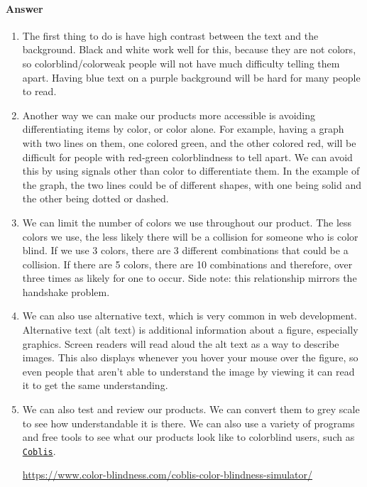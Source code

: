 \documentclass{article}
\begin{document}
\paragraph{Answer}
\begin{enumerate}
	\item The first thing to do is have high contrast between the text and the background. Black and white work well for this, because they are not colors, so colorblind/colorweak people will not have much difficulty telling them apart. Having blue text on a purple background will be hard for many people to read.
	
	\item Another way we can make our products more accessible is avoiding differentiating items by color, or color alone. For example, having a graph with two lines on them, one colored green, and the other colored red, will be difficult for people with red-green colorblindness to tell apart. We can avoid this by using signals other than color to differentiate them. In the example of the graph, the two lines could be of different shapes, with one being solid and the other being dotted or dashed.
	
	\item We can limit the number of colors we use throughout our product. The less colors we use, the less likely there will be a collision for someone who is color blind. If we use 3 colors, there are 3 different combinations that could be a collision. If there are 5 colors, there are 10 combinations and therefore, over three times as likely for one to occur. Side note: this relationship mirrors the handshake problem.
	
	\item We can also use alternative text, which is very common in web development. Alternative text (alt text) is additional information about a figure, especially graphics. Screen readers will read aloud the alt text as a way to describe images. This also displays whenever you hover your mouse over the figure, so even people that aren't able to understand the image by viewing it can read it to get the same understanding.
	
	\item We can also test and review our products. We can convert them to grey scale to see how understandable it is there. We can also use a variety of programs and free tools to see what our products look like to colorblind users, such as \href{https://www.color-blindness.com/coblis-color-blindness-simulator/}{\nolinkurl{Coblis}}. 
	
	\url{https://www.color-blindness.com/coblis-color-blindness-simulator/}

\end{enumerate}
\end{document}
